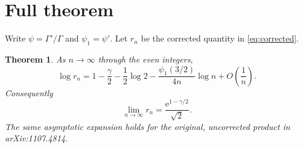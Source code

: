 \documentclass[11pt]{article}
\newtheorem{theorem}{Theorem}
\newcommand{\e}{\mathrm e}
\begin{document}
\section{Full theorem}

Write $\psi=\Gamma'/\Gamma$ and $\psi_1=\psi'$.  Let $r_n$ be the corrected
quantity in \eqref{eq:corrected}.

\begin{theorem}\label{thm:main}
As $n\to\infty$ through the even integers,
\begin{equation}\label{eq:refined}
 \log r_n
 =1-\frac\gamma2-\frac12\log2
  -\frac{\psi_1(3/2)}{4n}\log n+O\!\left(\frac1n\right).
\end{equation}
Consequently
\[
             \lim_{n\to\infty}r_n
             =\frac{\e^{1-\gamma/2}}{\sqrt2}.
\]
The same asymptotic expansion holds for the original, uncorrected product in
arXiv:1107.4814.
\end{theorem}
\end{document}
